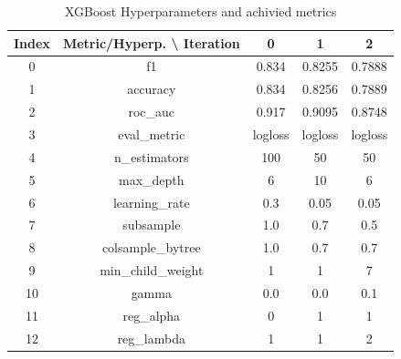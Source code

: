 \documentclass{article}%
\begin{document}
%


\begin{table}[h!]%
\caption{XGBoost Hyperparameters and achivied metrics}%
\vspace{0.2cm}%
\centering%
\begin{tabular}{|c||c||c||c||c|}%
\hline%
Index&Metric/Hyperp. \textbackslash{} Iteration&0&1&2\\%
\hline%
0&f1&0.834&0.8255&0.7888\\%
1&accuracy&0.834&0.8256&0.7889\\%
2&roc\_auc&0.917&0.9095&0.8748\\%
3&eval\_metric&logloss&logloss&logloss\\%
4&n\_estimators&100&50&50\\%
5&max\_depth&6&10&6\\%
6&learning\_rate&0.3&0.05&0.05\\%
7&subsample&1.0&0.7&0.5\\%
8&colsample\_bytree&1.0&0.7&0.7\\%
9&min\_child\_weight&1&1&7\\%
10&gamma&0.0&0.0&0.1\\%
11&reg\_alpha&0&1&1\\%
12&reg\_lambda&1&1&2\\%
\hline%
\end{tabular}%
\end{table}

%
\end{document}
